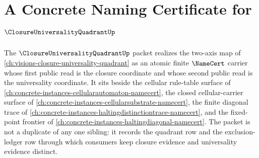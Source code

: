 \chapter{A Concrete Naming Certificate for $\ClosureUniversalityQuadrantUp$}
\label{ch:concrete-instances-closureuniversalityquadrant-namecert}

The $\ClosureUniversalityQuadrantUp$ packet realizes the two-axis map of \autoref{ch:visions-closure-universality-quadrant} as an atomic finite $\NameCert$ carrier whose first public read is the closure coordinate and whose second public read is the universality coordinate. It sits beside the cellular rule-table surface of \autoref{ch:concrete-instances-cellularautomaton-namecert}, the closed cellular-carrier surface of \autoref{ch:concrete-instances-cellularsubstrate-namecert}, the finite diagonal trace of \autoref{ch:concrete-instances-haltingdistinctiontrace-namecert}, and the fixed-point frontier of \autoref{ch:concrete-instances-haltingdiagonal-namecert}. The packet is not a duplicate of any one sibling: it records the quadrant row and the exclusion-ledger row through which consumers keep closure evidence and universality evidence distinct.



